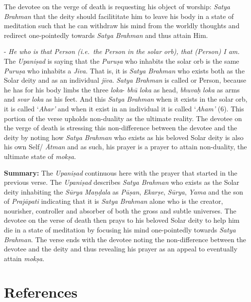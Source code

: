 The devotee on the verge of death is requesting his object of worship: \emph{Satya Brahman} that the deity should facilititate him to leave his body in a state of meditation such that he can withdraw his mind from the worldly thoughts and redirect one-pointedly towards \emph{Satya Brahman} and thus attain Him.

- \emph{He who is that Person (i.e.\ the Person in the solar orb), that (Person) I am.} The \emph{Upaniṣad} is saying that the \emph{Puruṣa} who inhabits the solar orb is the same \emph{Puruṣa} who inhabits a \emph{Jīva}. That is, it is \emph{Satya Brahman} who exists both as the Solar deity and as an individual \emph{jīva}. \emph{Satya Brahman} is called  or Person, because he has for his body limbs the three \emph{loka}- \emph{bhū} \emph{loka} as head, \emph{bhuvaḥ} \emph{loka} as arms and \emph{svar} \emph{loka} as his feet. And this \emph{Satya Brahman} when it exists in the solar orb, it is called `\emph{Ahar'} and when it exist in an individual it is called `\emph{Aham'} (6). This portion of the verse upholds non-duality as the ultimate reality. The devotee on the verge of death is stressing this non-difference between the devotee and the deity by noting how \emph{Satya Brahman} who exists as his beloved Solar deity is also his own Self/ \emph{Ātman} and as such, his prayer is a prayer to attain non-duality, the ultimate state of \emph{mokṣa}.

\textbf{Summary:} The \emph{Upaniṣad} continuous here with the prayer that started in the previous verse. The \emph{Upaniṣad} describes \emph{Satya Brahman} who exists as the Solar deity inhabiting the \emph{Sūrya} \emph{Maṇḍala} as \emph{Pūṣan}, \emph{Ekarṣe}, \emph{Sūrya}, \emph{Yama} and the son of \emph{Prajāpati} indicating that it is \emph{Satya Brahman} alone who is the creator, nourisher, controller and absorber of both the gross and subtle universes. The devotee on the verse of death then prays to his beloved Solar deity to help him die in a state of meditation by focusing his mind one-pointedly towards \emph{Satya Brahman}. The verse ends with the devotee noting the non-difference between the devotee and the deity and thus revealing his prayer as an appeal to eventually attain \emph{mokṣa}.

\section*{References}

